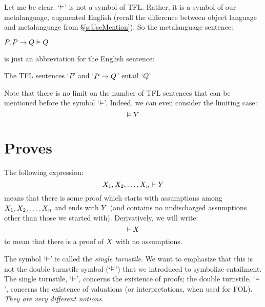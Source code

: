 Let me be clear. `$\vDash$' is not a symbol of TFL. Rather, it is a symbol of our metalanguage, augmented English (recall the difference between object language and metalanguage from \S\ref{s:UseMention}). So the metalanguage sentence:
\begin{ebullet}
	\item $P, P \rightarrow Q \vDash Q$
\end{ebullet}
is just an abbreviation for the English sentence:
\begin{ebullet}
	\item The TFL sentences `$P$' and `$P \rightarrow Q$' entail `$Q$'
\end{ebullet}
Note that there is no limit on the number of TFL sentences that can be mentioned before the symbol `$\vDash$'. Indeed, we can even consider the limiting case:
$$\vDash Y$$

\section{Proves}
The following expression:
$$X_1, X_2, \ldots, X_n \vdash Y$$
means that there is some proof which starts with assumptions among $X_1, X_2, \ldots, X_n$ and ends with $Y$ (and contains no undischarged assumptions other than those we started with). Derivatively, we will write:
$$\vdash X$$
to mean that there is a proof of $X$ with no assumptions.

The symbol `$\vdash$' is called the \emph{single turnstile}. We want to emphasize that this is not the {double turnstile} symbol (`$\vDash$') that we introduced  to symbolize entailment. The single turnstile, `$\vdash$', concerns the existence of proofs; the double turnstile, `$\vDash$', concerns the existence of valuations (or interpretations, when used for FOL). \emph{They are very different notions.}




